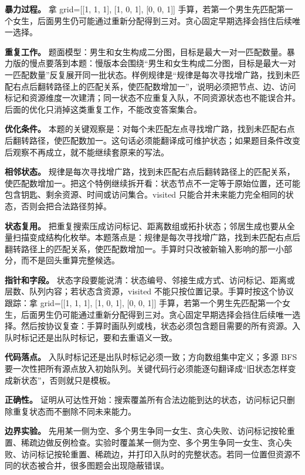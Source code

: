 \textbf{暴力过程。} 拿 grid=[[1, 1, 1], [1, 0, 1], [0, 0, 1]] 手算，若第一个男生先匹配第一个女生，后面男生仍可能通过重新分配得到三对。贪心固定早期选择会挡住后续唯一选择。

\textbf{重复工作。} 题面模型：男生和女生构成二分图，目标是最大一对一匹配数量。暴力版的慢点要落到本题：慢版本会围绕“男生和女生构成二分图，目标是最大一对一匹配数量”反复展开同一批状态。样例规律是“规律是每次寻找增广路，找到未匹配右点后翻转路径上的匹配关系，使匹配数增加一”，说明必须把节点、边、访问标记和资源维度一次建清；同一状态不应重复入队，不同资源状态也不能误合并。后面的优化只消掉这类重复工作，不能改变答案集合。

\textbf{优化条件。} 本题的关键观察是：对每个未匹配左点寻找增广路，找到未匹配右点后翻转路径，使匹配数加一。这句话必须能翻译成可维护状态；如果题目条件改变后观察不再成立，就不能继续套原来的写法。

\textbf{相邻状态。} 规律是每次寻找增广路，找到未匹配右点后翻转路径上的匹配关系，使匹配数增加一。把这个特例继续拆开看：状态节点不一定等于原始位置，还可能包含钥匙、剩余资源、时间或访问集合。visited 只能合并未来能力完全相同的状态，否则会把合法路径剪掉。

\textbf{状态复用。} 把重复搜索压成访问标记、距离数组或拓扑状态；邻居生成也要从全量扫描变成结构化枚举。本题落点是：规律是每次寻找增广路，找到未匹配右点后翻转路径上的匹配关系，使匹配数增加一。手算时只改被新输入影响的那一小部分，而不是回头重算完整候选。

\textbf{指针和字段。} 状态字段要能说清：状态编号、邻接生成方式、访问标记、距离或层数、队列内容；若状态含资源，visited 不能只按位置记录。手算时按这个协议跟踪：拿 grid=[[1, 1, 1], [1, 0, 1], [0, 0, 1]] 手算，若第一个男生先匹配第一个女生，后面男生仍可能通过重新分配得到三对。贪心固定早期选择会挡住后续唯一选择。然后按协议复查：手算时画队列或栈，状态必须包含题目需要的所有资源。入队时标记还是出队时标记，要和去重语义一致。

\textbf{代码落点。} 入队时标记还是出队时标记必须一致；方向数组集中定义；多源 BFS 要一次性把所有源点放入初始队列。关键代码行必须能逐句翻译成“旧状态怎样变成新状态”，否则就只是模板。

\textbf{正确性。} 证明从可达性开始：搜索覆盖所有合法边能到达的状态，访问标记只删除重复状态而不删除不同未来能力。

\textbf{边界实验。} 先用某一侧为空、多个男生争同一女生、贪心失败、访问标记按轮重置、稀疏边做反例检查。实验时覆盖某一侧为空、多个男生争同一女生、贪心失败、访问标记按轮重置、稀疏边，并打印入队时的完整状态。若同一位置但资源不同的状态被合并，很多图题会出现隐蔽错误。

